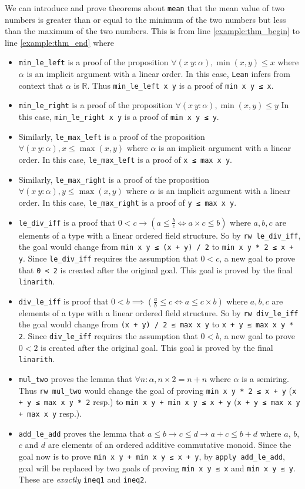 \documentclass{report}
\theoremstyle{definition}
\theoremstyle{plain}
\begin{document}
We can introduce and prove theorems about {\tt mean} that the mean value of two numbers is greater than or equal to the minimum of the two numbers but less than the maximum of the two numbers. This is from line \ref{example:thm_begin} to line \ref{example:thm_end} where
\begin{itemize}
  \item {\tt min\_le\_left} is a proof of the proposition $\forall (x\ y : \alpha), \min(x, y) \le x$ where $\alpha$ is an implicit argument with a linear order. In this case, {\tt Lean} infers from context that $\alpha$ is $\mathbb R$. Thus {\tt min\_le\_left x y} is a proof of {\tt min x y ≤ x}.
  \item {\tt min\_le\_right} is a proof of the proposition $\forall (x\ y : \alpha), \min(x, y) \le y$ In this case, {\tt min\_le\_right x y} is a proof of {\tt min x y ≤ y}.
  \item Similarly, {\tt le\_max\_left} is a proof of the proposition $\forall (x\ y : \alpha), x \le \max(x, y)$ where $\alpha$ is an implicit argument with a linear order. In this case, {\tt le\_max\_left} is a proof of {\tt x ≤ max x y}.
  \item Similarly, {\tt le\_max\_right} is a proof of the proposition $\forall (x\ y : \alpha), y \le \max(x, y)$ where $\alpha$ is an implicit argument with a linear order. In this case, {\tt le\_max\_right} is a proof of {\tt y ≤ max x y}.
  \item {\tt le\_div\_iff} is a proof that $0 < c \to (a \le \frac{b}{c} \iff a\times c \le b)$ where $a,b,c$ are elements of a type with a linear ordered field structure. So by {\tt rw le\_div\_iff}, the goal would change from {\tt min x y ≤ (x + y) / 2} to {\tt min x y * 2 ≤ x + y}. Since {\tt le\_div\_iff} requires the assumption that $0<c$, a new goal to prove that {\tt 0 < 2} is created after the original goal. This goal is proved by the final {\tt linarith}.
  \item {\tt div\_le\_iff} is proof that $0 < b \implies (\frac a b \le c \iff a \le c \times b)$ where $a,b,c$ are elements of a type with a linear ordered field structure. So by {\tt rw div\_le\_iff} the goal would change from {\tt (x + y) / 2 ≤ max x y} to {\tt x + y ≤ max x y * 2}. Since {\tt div\_le\_iff} requires the assumption that $0 < b$, a new goal to prove $0 < 2$ is created after the original goal. This goal is proved by the final {\tt linarith}.
  \item {\tt mul\_two} proves the lemma that $\forall n:\alpha, n\times 2 = n+n$ where $\alpha$ is a semiring. Thus {\tt rw mul\_two} would change the goal of proving {\tt min x y * 2 ≤ x + y} ({\tt x + y ≤ max x y * 2} resp.) to {\tt min x y + min x y ≤ x + y} ({\tt x + y ≤ max x y + max x y} resp.).
  \item {\tt add\_le\_add} proves the lemma that $a \le b \to c \le d \to a + c \le b + d$ where $a$, $b$, $c$ and $d$ are elements of an ordered additive commutative monoid. Since the goal now is to prove {\tt min x y + min x y ≤ x + y}, by {\tt apply add\_le\_add}, goal will be replaced by two goals of proving {\tt min x y ≤ x} and {\tt min x y ≤ y}. These are {\it exactly} {\tt ineq1} and {\tt ineq2}.
\end{itemize}
\end{document}
